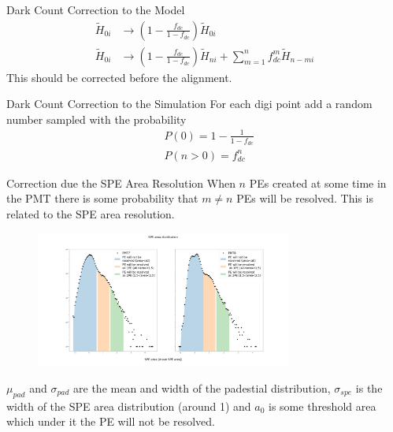 \documentclass{beamer}
\begin{document}
\begin{frame}{Dark Count Correction to the Model}
\begin{equation}
\begin{split}
\tilde{H}_{0i}&\rightarrow \left(1-\frac{f_{dc}}{1-f_{dc}}\right)\tilde{H}_{0i}\\
\tilde{H}_{0i}&\rightarrow \left(1-\frac{f_{dc}}{1-f_{dc}}\right)\tilde{H}_{ni}+\sum_{m=1}^{n}f_{dc}^m\tilde{H}_{n-mi}
\end{split}
\end{equation}
This should be corrected before the alignment.
\end{frame}


\begin{frame}{Dark Count Correction to the Simulation}
For each digi point add a random number sampled with the probability
\begin{equation}
\begin{split}
&P(0)=1-\frac{1}{1-f_{dc}}\\
&P(n>0)=f_{dc}^n
\end{split}
\end{equation}
\end{frame}

\begin{frame}{Correction due the SPE Area Resolution}
When $n$ PEs created at some time in the PMT there is some probability that $m\neq n$ PEs will be resolved. This is related to the SPE area resolution. 

\begin{figure}[h]
\includegraphics[width=0.75\textwidth]{SPE_area.png}
\end{figure}

$\mu_{pad}$ and $\sigma_{pad}$ are the mean and width of the padestial distribution, $\sigma_{spe}$ is the width of the SPE area distribution (around 1) and $a_0$ is some threshold area which under it the PE will not be resolved. 
\end{frame}
\end{document}
